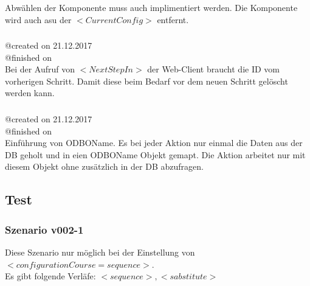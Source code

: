 \documentclass{article}
\begin{document}
Abw\"ahlen der Komponente muss auch implimentiert werden. Die Komponente wird
auch asu der $<CurrentConfig>$ entfernt.\\

\subsubsection{}
@created on 21.12.2017\\
@finished on \\

Bei der Aufruf von $<NextStepIn>$ der Web-Client braucht die ID vom vorherigen
Schritt. Damit diese beim Bedarf vor dem neuen Schritt gel\"oscht werden kann.

\subsubsection{}
@created on 21.12.2017\\
@finished on \\

Einf\"uhrung von ODBOName. Es bei jeder Aktion nur einmal die Daten aus der DB
geholt und in eien ODBOName Objekt gemapt. Die Aktion arbeitet nur mit diesem
Objekt ohne zus\"atzlich in der DB abzufragen.

\subsection{Test}

\subsubsection{Szenario v002-1}

Diese Szenario nur m\"oglich bei der Einstellung von
$<configurationCourse=sequence>$.\\

\noindent Es gibt folgende Verl\"afe: $<sequence>, <sabstitute>$
\end{document}
